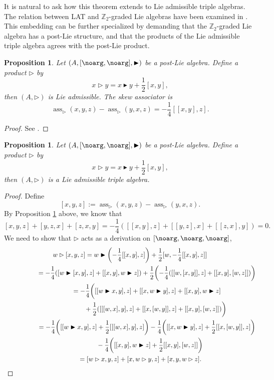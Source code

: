 \documentclass[pdftex]{sigma}
\numberwithin{equation}{section}
\newtheorem{Proposition}[Theorem]{Proposition}
 { \theoremstyle{definition}
\newtheorem{Definition}[Theorem]{Definition}
\newtheorem{Note}[Theorem]{Note}
\newtheorem{Example}[Theorem]{Example}
\newtheorem{Remark}[Theorem]{Remark} }
\begin{document}
It is natural to ask how this theorem extends to Lie admissible triple algebras. The relation between LAT and $\mathbb{Z}_2$-graded Lie algebras have been examined in \cite{GS_00,Sokolov_17}. This embedding can be further specialized by demanding that the $\mathbb{Z}_2$-graded Lie algebra has a post-Lie structure, and that the products of the Lie admissible triple algebra agrees with the post-Lie product.

\begin{Proposition}\label{prop:Lie_adm_in_psot-Lie}
Let $(A,[\noarg,\noarg],\blacktriangleright)$ be a post-Lie algebra. Define a product $\rhd$ by
\[
x \rhd y = x \blacktriangleright y + \frac{1}{2}[x,y],
\]
then $(A,\rhd)$ is Lie admissible. The skew associator is
\[
\operatorname{ass}_{\rhd}(x,y,z) - \operatorname{ass}_{\rhd}(y,x,z) = - \frac{1}{4}[[x,y],z].
\]
\end{Proposition}

\begin{proof}
See \cite[Proposition 2.7]{MK_Lundervold_2013}.
\end{proof}


\begin{Proposition}
Let $(A,[\noarg,\noarg],\blacktriangleright)$ be a post-Lie algebra. Define a product $\rhd$ by
\[
x \rhd y = x \blacktriangleright y + \frac{1}{2}[x,y],
\]
then $(A,\rhd)$ is a Lie admissible triple algebra.
\end{Proposition}

\begin{proof}
Define
\[
[x,y,z] := \operatorname{ass}_{\rhd}(x,y,z) - \operatorname{ass}_{\rhd}(y,x,z).
\]
By Proposition \ref{prop:Lie_adm_in_psot-Lie} above, we know that
\[
[x,y,z]+[y,z,x] + [z,x,y] = -\frac{1}{4}([[x,y],z]+[[y,z],x] + [[z,x],y] ) = 0.
\]
We need to show that $\rhd$ acts as a derivation on $[\noarg,\noarg,\noarg]$,
\begin{gather*}
 w \rhd [x,y,z] = w \blacktriangleright \biggl(-\frac{1}{4}[[x,y],z]\biggr) + \frac{1}{2}[w , -\frac{1}{4}[[x,y],z]] \\ \hphantom{w \rhd [x,y,z] }{}
 = -\frac{1}{4} ([w \blacktriangleright [x,y], z] + [[x,y],w\blacktriangleright z] ) +\frac{1}{2} \biggl(-\frac{1}{4} ([[w,[x,y]],z] + [[x,y],[w,z]] ) \biggr) \\ \hphantom{w \rhd [x,y,z] }{}
 = -\frac{1}{4} \biggl( [[w \blacktriangleright x,y], z] + [[x, w\blacktriangleright y],z] + [[x,y],w\blacktriangleright z] \\ \hphantom{w \rhd [x,y,z] =-\frac{1}{4}}{}
 +\frac{1}{2} ([[[w,x],y],z] + [[x,[w,y]],z] + [[x,y],[w,z]] ) \biggr) \\ \hphantom{w \rhd [x,y,z] }{}
 = -\frac{1}{4} \biggl([[w \blacktriangleright x,y], z] + \frac{1}{2}[[[w,x],y],z] \biggr) - \frac{1}{4} \biggl([[x, w\blacktriangleright y],z] +\frac{1}{2}[[x,[w,y]],z] \biggr) \\ \hphantom{w \rhd [x,y,z] =}{}
 - \frac{1}{4} \biggl( [[x,y],w\blacktriangleright z]+\frac{1}{2}[[x,y],[w,z]] \biggr) \\ \hphantom{w \rhd [x,y,z] }{}
 = [w\rhd x ,y,z] + [x,w\rhd y,z] + [x,y,w\rhd z].
\tag*{\qed}
\end{gather*}
\renewcommand{\qed}{}
\end{proof}
\end{document}
